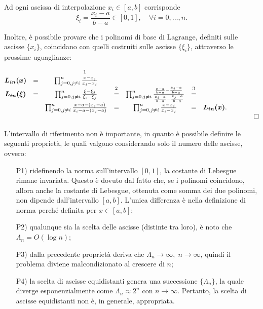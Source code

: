 Ad ogni ascissa di interpolazione $x_i\in [a,b]$ corrisponde
\begin{equation}\label{eq:xi_i}
    \xi_i=\frac{x_i-a}{b-a}\in [0,1],\quad \forall i=0,\hdots,n.
\end{equation}

Inoltre, è possibile provare che i polinomi di base di Lagrange, definiti sulle ascisse $\{x_i\}$, coincidano con quelli costruiti sulle ascisse $\{\xi_i\}$, attraverso le prossime uguaglianze:

\begin{equation*}
    \begin{matrix}
        \boldsymbol{L_{in}(x)} &=&\prod_{j=0, j\neq i}^n\frac{\overset{\footnotemark}{x}-x_j}{x_i-x_j}&&&&&&\\
        \boldsymbol{L_{in}(\xi)} &=& \prod_{j=0,j\neq i}^n\frac{\xi-\xi_j}{\xi_i-\xi_j}&\overset{\footnotemark}{=}&\prod_{j=0, j\neq i}^n\frac{\frac{x-a}{b-a}-\frac{x_j-a}{b-a}}{\frac{x_i-a}{b-a}-\frac{x_j-a}{b-a}}&\overset{\footnotemark}{=}&\\
        &&\prod_{j=0,j\neq i}^n\frac{x-a-(x_j-a)}{x_i-a-(x_j-a)}&=&\prod_{j=0,j\neq i}^n\frac{x-x_j}{x_i-x_j}&=&\boldsymbol{L_{in}(x)}.\\
        &&&&&&&&\qed
    \end{matrix}
\end{equation*}

\addtocounter{footnote}{-2}



L'intervallo di riferimento non è importante, in quanto è possibile definire le seguenti proprietà, le quali valgono considerando solo il numero delle ascisse, ovvero:

\begin{property}[di $\Lambda_n$]
	\begin{itemize}
		\item [P1)] ridefinendo la norma sull'intervallo $[0,1]$, la costante di Lebesgue rimane invariata. Questo è dovuto dal fatto che, se i polinomi coincidono, allora anche la costante di Lebesgue, ottenuta come somma dei due polinomi, non dipende dall'intervallo $[a,b]$. L'unica differenza è nella definizione di norma perché definita per $x\in[a,b]$;
		\item [P2)] qualunque sia la scelta delle ascisse (distinte tra loro), è noto che $\Lambda_n = O(\log n)$;
		\item[P3)] dalla precedente proprietà deriva che $\Lambda_n\rightarrow\infty,\; n\rightarrow\infty$, quindi il problema diviene malcondizionato al crescere di $n$;
		\item[P4)] la scelta di ascisse equidistanti genera una successione $\{\Lambda_n\}$, la quale diverge esponenzialmente come $\Lambda_n\approx 2^n$ con $n\rightarrow\infty$. Pertanto, la scelta di ascisse equidistanti non è, in generale, appropriata.
	\end{itemize}
\end{property}

